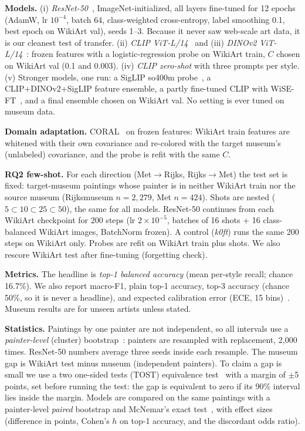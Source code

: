 \documentclass[conference]{IEEEtran}
\begin{document}
\textbf{Models.} (i) \emph{ResNet-50}~\cite{he2016}, ImageNet-initialized, all layers fine-tuned for 12 epochs (AdamW, lr $10^{-4}$, batch 64, class-weighted cross-entropy, label smoothing 0.1, best epoch on WikiArt val), seeds 1--3. Because it never saw web-scale art data, it is our cleanest test of transfer. (ii) \emph{CLIP ViT-L/14}~\cite{radford2021} and (iii) \emph{DINOv2 ViT-L/14}~\cite{oquab2024}: frozen features with a logistic-regression probe on WikiArt train, $C$ chosen on WikiArt val (0.1 and 0.003). (iv) \emph{CLIP zero-shot} with three prompts per style. (v) Stronger models, one run: a SigLIP so400m probe~\cite{zhai2023}, a CLIP+DINOv2+SigLIP feature ensemble, a partly fine-tuned CLIP with WiSE-FT~\cite{wortsman2022}, and a final ensemble chosen on WikiArt val. No setting is ever tuned on museum data.

\textbf{Domain adaptation.} CORAL~\cite{sun2016coral} on frozen features: WikiArt train features are whitened with their own covariance and re-colored with the target museum's (unlabeled) covariance, and the probe is refit with the same $C$.

\textbf{RQ2 few-shot.} For each direction (Met$\to$Rijks, Rijks$\to$Met) the test set is fixed: target-museum paintings whose painter is in neither WikiArt train nor the source museum (Rijksmuseum $n{=}2{,}279$, Met $n{=}424$). Shots are nested ($5\subset10\subset25\subset50$), the same for all models. ResNet-50 continues from each WikiArt checkpoint for 200 steps (lr $2{\times}10^{-5}$, batches of 16 shots + 16 class-balanced WikiArt images, BatchNorm frozen). A control (\emph{k0ft}) runs the same 200 steps on WikiArt only. Probes are refit on WikiArt train plus shots. We also rescore WikiArt test after fine-tuning (forgetting check).

\textbf{Metrics.} The headline is \emph{top-1 balanced accuracy} (mean per-style recall; chance 16.7\%). We also report macro-F1, plain top-1 accuracy, top-3 accuracy (chance 50\%, so it is never a headline), and expected calibration error (ECE, 15 bins)~\cite{guo2017}. Museum results are for unseen artists unless stated.

\textbf{Statistics.} Paintings by one painter are not independent, so all intervals use a \emph{painter-level} (cluster) bootstrap~\cite{davison1997}: painters are resampled with replacement, 2,000 times. ResNet-50 numbers average three seeds inside each resample. The museum gap is WikiArt test minus museum (independent painters). To claim a gap is small we use a two one-sided tests (TOST) equivalence test~\cite{schuirmann1987} with a margin of $\pm$5 points, set before running the test: the gap is equivalent to zero if its 90\% interval lies inside the margin. Models are compared on the same paintings with a painter-level \emph{paired} bootstrap and McNemar's exact test~\cite{mcnemar1947}, with effect sizes (difference in points, Cohen's $h$ on top-1 accuracy, and the discordant odds ratio).
\end{document}
